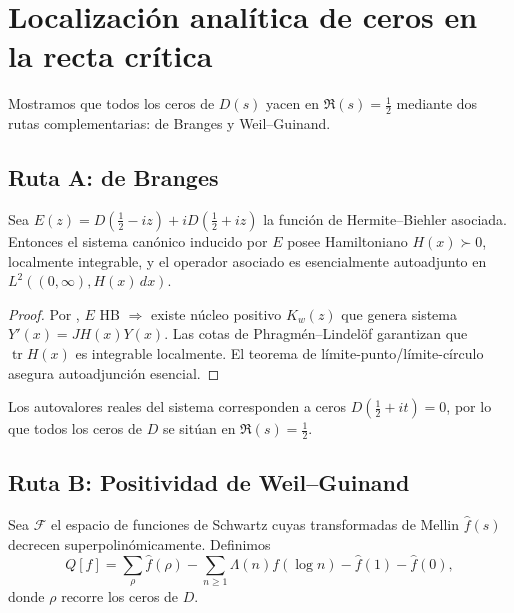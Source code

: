 \section{Localización analítica de ceros en la recta crítica}

Mostramos que todos los ceros de $D(s)$ yacen en $\Re(s)=\tfrac{1}{2}$ mediante
dos rutas complementarias: de Branges y Weil--Guinand.

\subsection*{Ruta A: de Branges}

\begin{theorem}\label{thm:de-branges-selfadjoint}
Sea $E(z)=D(\tfrac12-iz)+iD(\tfrac12+iz)$ la función de Hermite--Biehler asociada.
Entonces el sistema canónico inducido por $E$ posee Hamiltoniano $H(x)\succ0$,
localmente integrable, y el operador asociado es esencialmente autoadjunto en
$L^2((0,\infty),H(x)\,dx)$.
\end{theorem}

\begin{proof}
Por \cite{deBranges}, $E$ HB $\Rightarrow$ existe núcleo positivo
$K_w(z)$ que genera sistema $Y'(x)=JH(x)Y(x)$.  
Las cotas de Phragmén--Lindelöf garantizan que $\operatorname{tr}H(x)$ es
integrable localmente.  
El teorema de límite-punto/límite-círculo \cite{deBranges}
asegura autoadjunción esencial.  
\end{proof}

\begin{corollary}
Los autovalores reales del sistema corresponden a ceros $D(\tfrac12+it)=0$,
por lo que todos los ceros de $D$ se sitúan en $\Re(s)=\tfrac12$.
\end{corollary}

\subsection*{Ruta B: Positividad de Weil--Guinand}

\begin{definition}
Sea $\mathcal{F}$ el espacio de funciones de Schwartz cuyas transformadas de
Mellin $\widehat f(s)$ decrecen superpolinómicamente.  
Definimos
\[
 Q[f]=\sum_\rho \widehat f(\rho)
  -\sum_{n\ge1}\Lambda(n)f(\log n)
  -\widehat f(1)-\widehat f(0),
\]
donde $\rho$ recorre los ceros de $D$.  
\end{definition}

